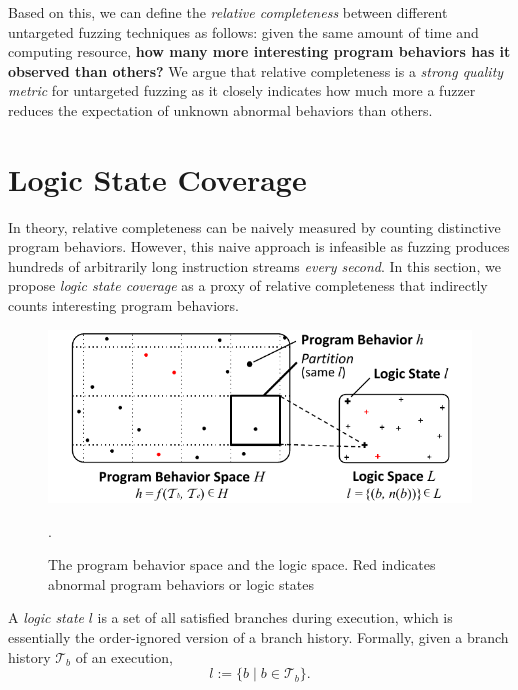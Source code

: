 \documentclass[letterpaper,twocolumn,10pt]{article}
\begin{document}
Based on this, we can define the \emph{relative completeness} between
different untargeted fuzzing techniques as follows: given the same amount of
time and computing resource, \textbf{how many more interesting program behaviors
has it observed than others?} We argue that relative completeness is a
\emph{strong quality metric} for untargeted fuzzing as it closely indicates how
much more a fuzzer reduces the expectation of unknown abnormal behaviors than
others. 



\section{Logic State Coverage}
\label{s:lscov}

In theory, relative completeness can be naively measured by counting distinctive
program behaviors. However, this naive approach is infeasible as fuzzing
produces hundreds of arbitrarily long instruction streams \emph{every second}.
%
In this section, we propose \emph{logic state coverage} as a proxy of relative
completeness that indirectly counts interesting program behaviors.


\begin{figure}[t]
  \centering
  \includegraphics[width=\columnwidth]{images/prog-to-logic.pdf}
  \caption{The program behavior space and the logic space. Red indicates
  abnormal program behaviors or logic states}.
  \label{f:prog-to-logic}
\end{figure}

%
A \emph{logic state} $l$ is a set of all satisfied branches during execution,
which is essentially the order-ignored version of a branch history. Formally,
given a branch history $\mathcal{T}_b$ of an execution,
%
\begin{equation}
\label{e:ls}
  l := \{b \mid b \in \mathcal{T}_b\}.
\end{equation}
\end{document}
